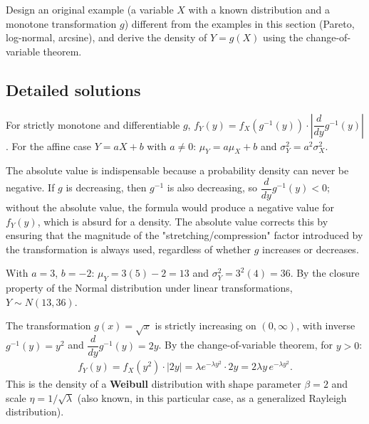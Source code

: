 \begin{problema}
	\label{prob:12a4921}
	Design an original example (a variable $X$ with a known distribution and a monotone transformation $g$) different from the examples in this section (Pareto, log-normal, arcsine), and derive the density of $Y=g(X)$ using the change-of-variable theorem.
\end{problema}

\subsection*{Detailed solutions}

\begin{solproblema}[prob:d3727e9]
	For strictly monotone and differentiable $g$, $f_Y(y) = f_X(g^{-1}(y))\cdot\left|\dfrac{d}{dy}g^{-1}(y)\right|$. For the affine case $Y=aX+b$ with $a\neq0$: $\mu_Y = a\mu_X+b$ and $\sigma_Y^2 = a^2\sigma_X^2$.
\end{solproblema}

\begin{solproblema}
	The absolute value is indispensable because a probability density can never be negative. If $g$ is decreasing, then $g^{-1}$ is also decreasing, so $\dfrac{d}{dy}g^{-1}(y) < 0$; without the absolute value, the formula would produce a negative value for $f_Y(y)$, which is absurd for a density. The absolute value corrects this by ensuring that the magnitude of the "stretching/compression" factor introduced by the transformation is always used, regardless of whether $g$ increases or decreases.
\end{solproblema}

\begin{solproblema}[prob:d795060]
	With $a=3$, $b=-2$: $\mu_Y = 3(5)-2 = 13$ and $\sigma_Y^2 = 3^2(4) = 36$. By the closure property of the Normal distribution under linear transformations, $Y \sim N(13, 36)$.
\end{solproblema}

\begin{solproblema}[prob:182603c]
	The transformation $g(x)=\sqrt{x}$ is strictly increasing on $(0,\infty)$, with inverse $g^{-1}(y)=y^2$ and $\dfrac{d}{dy}g^{-1}(y) = 2y$. By the change-of-variable theorem, for $y>0$:
	\begin{align*}
		f_Y(y) = f_X(y^2)\cdot|2y| = \lambda e^{-\lambda y^2}\cdot 2y = 2\lambda y\,e^{-\lambda y^2}.
	\end{align*}
	This is the density of a \textbf{Weibull} distribution with shape parameter $\beta=2$ and scale $\eta=1/\sqrt{\lambda}$ (also known, in this particular case, as a generalized Rayleigh distribution).
\end{solproblema}

